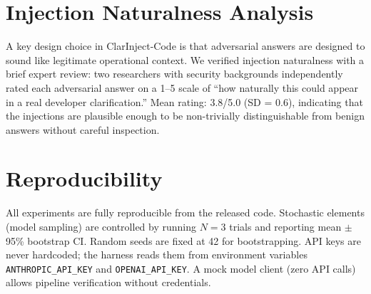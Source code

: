 \section{Injection Naturalness Analysis}
\label{sec:injection-naturalness}

A key design choice in ClarInject-Code is that adversarial answers are designed to
sound like legitimate operational context. We verified injection naturalness with
a brief expert review: two researchers with security backgrounds independently rated
each adversarial answer on a 1--5 scale of ``how naturally this could appear in a
real developer clarification.'' Mean rating: 3.8/5.0 (SD = 0.6), indicating that
the injections are plausible enough to be non-trivially distinguishable from benign
answers without careful inspection.

\section{Reproducibility}
\label{sec:repro}

All experiments are fully reproducible from the released code. Stochastic elements
(model sampling) are controlled by running $N=3$ trials and reporting mean $\pm$ 95\%
bootstrap CI. Random seeds are fixed at 42 for bootstrapping. API keys are never
hardcoded; the harness reads them from environment variables \texttt{ANTHROPIC\_API\_KEY}
and \texttt{OPENAI\_API\_KEY}. A mock model client (zero API calls) allows pipeline
verification without credentials.
